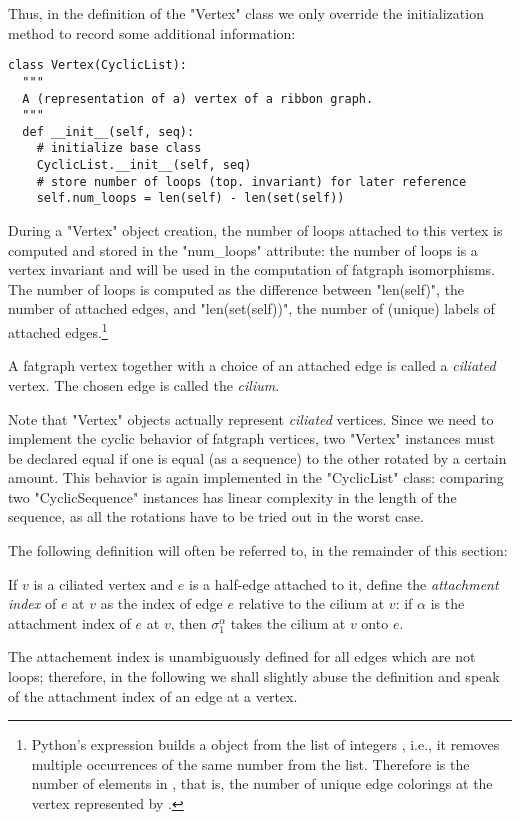 Thus, in the definition of the "Vertex" class we only override the
initialization method to record some additional information:
\begin{lstlisting}
class Vertex(CyclicList):
  """
  A (representation of a) vertex of a ribbon graph.
  """
  def __init__(self, seq):
    # initialize base class
    CyclicList.__init__(self, seq)
    # store number of loops (top. invariant) for later reference
    self.num_loops = len(self) - len(set(self))

\end{lstlisting}
During a "Vertex" object creation, the number of loops attached to
this vertex is computed and stored in the "num_loops" attribute: the
number of loops is a vertex invariant and will be used in the
computation of fatgraph isomorphisms.  The number of loops is computed
as the difference between "len(self)", the number of attached edges,
and "len(set(self))", the number of (unique) labels of attached
edges.\footnote{Python's expression  builds a 
  object from the list of integers , i.e., it removes multiple
  occurrences of the same number from the list.  Therefore
   is the number of elements in , that
  is, the number of unique edge colorings at the vertex represented by
  .}

\begin{definition}
  A fatgraph vertex together with a choice of an attached edge is
  called a \emph{ciliated} vertex.  The chosen edge is called the
  \emph{cilium}.
\end{definition}
Note that "Vertex" objects actually represent \emph{ciliated} vertices.
Since we need to implement the cyclic behavior of fatgraph vertices,
two "Vertex" instances must be declared equal if one is equal (as a
sequence) to the other rotated by a certain amount.  This behavior is
again implemented in the "CyclicList" class: comparing two
"CyclicSequence" instances has linear complexity in the length of
the sequence, as all the rotations have to be tried out in the worst
case.

The following definition will often be referred to, in the remainder
of this section:
\begin{definition}
  If $v$ is a ciliated vertex and $e$ is a half-edge attached to it, define
  the \emph{attachment index} of $e$ at $v$ as the index of edge $e$ relative
  to the cilium at $v$: if $\alpha$ is the attachment index of $e$ at
  $v$, then $\sigma_1^\alpha$ takes the cilium at $v$ onto $e$.
\end{definition}
The attachement index is unambiguously defined for all edges which are
not loops; therefore, in the following we shall slightly abuse the
definition and speak of the attachment index of an edge at a vertex.


